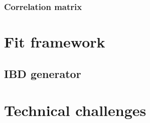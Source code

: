 \documentclass[../main.tex]{subfiles}
\begin{document}
\subsubsection{Correlation matrix}
\label{sec:joint_fit:corr_mat}


%
%
%
%


\section{Fit framework}
\label{sec:joint_fit:framework}
%
%
%
%
\subsection{IBD generator}
\label{sec:joint_fit:ibd-gen}
%

\section{Technical challenges}
\label{sec:joint_fit:tech}
%
%
%
\end{document}
